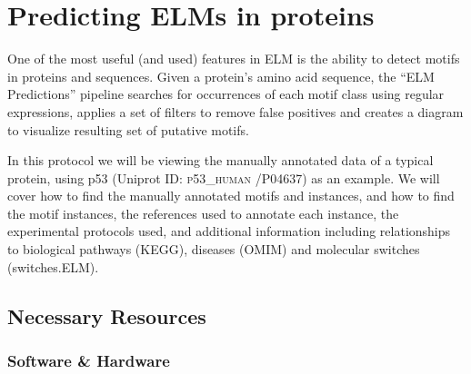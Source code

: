 \documentclass[12pt]{article}
\newcounter{proto}
\newcommand\uniprot[1]{%
	\textsc{\lowercase{#1}}%
}
\begin{document}
\clearpage

\section{Predicting ELMs in proteins}
\label{sec:predicting_p53}

One of the most useful (and used) features in ELM is the ability to
detect motifs in proteins and sequences. Given a protein's amino acid
sequence, the ``ELM Predictions'' pipeline searches for occurrences of
each motif class using regular expressions, applies a set of filters to
remove false positives and creates a diagram to visualize resulting
set of putative motifs.

In this protocol we will be viewing the manually annotated data of a
typical protein, using p53 (Uniprot ID: \uniprot{P53\_HUMAN}/P04637) as an
example. We will cover how to find the manually annotated motifs and instances,
and how to find the motif instances, the references used to annotate each
instance, the experimental protocols used, and additional information including
relationships to biological pathways (KEGG), diseases (OMIM) and molecular
switches (switches.ELM).

%
%
\subsection*{Necessary Resources}
\subsubsection*{Software \& Hardware}

\end{document}
